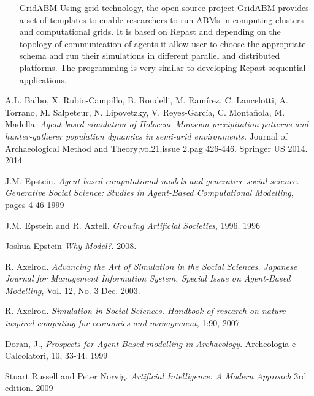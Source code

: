 \documentclass[11pt,oneside,a4paper,openright]{report}
\begin{document}
\begin{enumerate}
\item[GridABM]
Using grid technology, the open source project GridABM \cite{SzemesDeBack2010} provides a
set of templates to enable researchers to run ABMs in computing clusters and computational grids. It is
based on Repast and depending on the topology of communication of agents it allow user to choose the
appropriate schema and run their simulations in different parallel and distributed platforms. The
programming is very similar to developing Repast sequential applications.

\end{enumerate}



\begin{thebibliography}{50}

	A.L. Balbo, X. Rubio-Campillo, B. Rondelli, M. Ramírez, C. Lancelotti, A. Torrano, M. Salpeteur, 
	N. Lipovetzky, V. Reyes-García, C. Montañola, M. Madella.
	\emph{Agent-based simulation of Holocene Monsoon precipitation patterns and 
	hunter-gatherer population dynamics in semi-arid environments.} 
	Journal of Archaeological Method and Theory;vol21,issue 2.pag 426-446. Springer US 2014.
	2014



	J.M. Epstein. 
	\emph{Agent-based computational models and generative social science. Generative Social
	Science: Studies in Agent-Based Computational Modelling}, pages 4-46
	1999

	J.M. Epstein and R. Axtell.
	\emph{Growing Artificial Societies}, 1996.
	1996

	Joshua Epstein
	\emph{Why Model?}.
	2008.

	R. Axelrod. 
	\emph{Advancing the Art of Simulation in the Social Sciences. Japanese Journal for Management Information System, Special Issue on Agent-Based Modelling}, Vol. 12, No. 3 
	Dec. 2003. 

	R. Axelrod. 
	\emph{Simulation in Social Sciences. Handbook of research on nature-inspired computing for economics and management}, 1:90, 
	2007

	Doran, J., 
	\emph{Prospects for Agent-Based modelling in Archaeology}. Archeologia e Calcolatori, 10, 33-44.
	1999

	Stuart Russell and Peter Norvig.
	\emph{Artificial Intelligence: A Modern Approach} 3rd edition.
	2009


\end{thebibliography}
\end{document}
